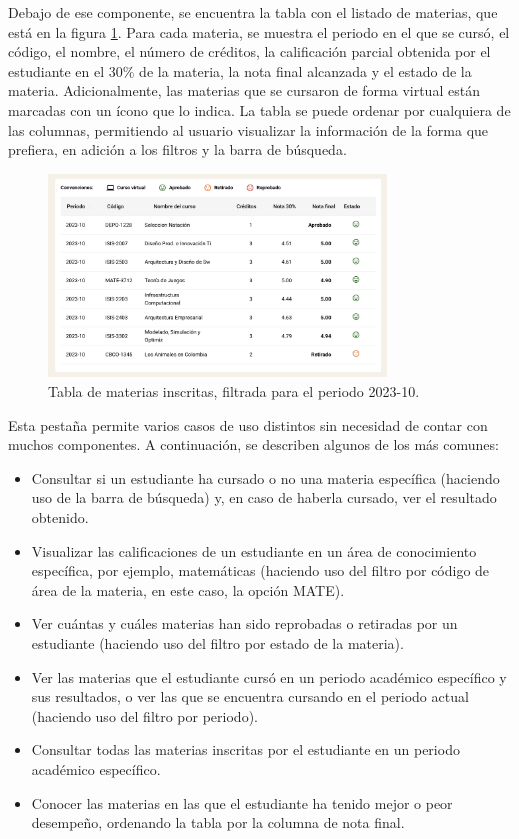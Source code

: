 Debajo de ese componente, se encuentra la tabla con el listado de materias, que está en la figura \ref{fig:tabla_materias}. Para cada materia, se muestra el periodo en el que se cursó, el código, el nombre, el número de créditos, la calificación parcial obtenida por el estudiante en el 30\% de la materia, la nota final alcanzada y el estado de la materia. Adicionalmente, las materias que se cursaron de forma virtual están marcadas con un ícono que lo indica. La tabla se puede ordenar por cualquiera de las columnas, permitiendo al usuario visualizar la información de la forma que prefiera, en adición a los filtros y la barra de búsqueda.

\begin{figure}[H]
	\centering
	\includegraphics[width=0.8\textwidth]{assets/nes/tabla_materias.png}
	\caption{Tabla de materias inscritas, filtrada para el periodo 2023-10.}
	\label{fig:tabla_materias}
\end{figure}

Esta pestaña permite varios casos de uso distintos sin necesidad de contar con muchos componentes. A continuación, se describen algunos de los más comunes:
\begin{itemize}
	\item Consultar si un estudiante ha cursado o no una materia específica (haciendo uso de la barra de búsqueda) y, en caso de haberla cursado, ver el resultado obtenido.
	\item Visualizar las calificaciones de un estudiante en un área de conocimiento específica, por ejemplo, matemáticas (haciendo uso del filtro por código de área de la materia, en este caso, la opción MATE).
	\item Ver cuántas y cuáles materias han sido reprobadas o retiradas por un estudiante (haciendo uso del filtro por estado de la materia).
	\item Ver las materias que el estudiante cursó en un periodo académico específico y sus resultados, o ver las que se encuentra cursando en el periodo actual (haciendo uso del filtro por periodo).
	\item Consultar todas las materias inscritas por el estudiante en un periodo académico específico.
	\item Conocer las materias en las que el estudiante ha tenido mejor o peor desempeño, ordenando la tabla por la columna de nota final.
\end{itemize}

